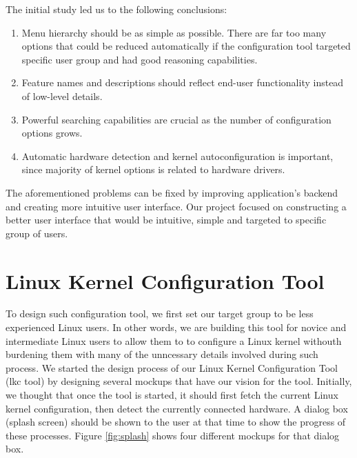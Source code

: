 \documentclass{chi2009}
\begin{document}

The initial study led us to the following conclusions:
\begin{enumerate}
\item Menu hierarchy should be as simple as possible. There are far too many options that could be reduced automatically if the configuration tool targeted specific user group and had good reasoning capabilities.
\item Feature names and descriptions should reflect end-user functionality instead of low-level details.
\item Powerful searching capabilities are crucial as the number of configuration options grows.
\item Automatic hardware detection and kernel autoconfiguration is important, since majority of kernel options is related to hardware drivers.
\end{enumerate}

The aforementioned problems can be fixed by improving application's backend and creating more intuitive user interface. Our project focused on constructing a better user interface that would be intuitive, simple and targeted to specific group of users.

\section{Linux Kernel Configuration Tool}\label{sec:lkc}

To design such configuration tool, we first set our target group to be less experienced Linux users. In other words, we are building this tool for novice and
intermediate Linux users to allow them to to configure a Linux kernel withouth burdening them with many of the unncessary details involved during such process.
We started the design process of our Linux Kernel Configuration Tool (lkc tool) by designing several mockups that have our vision for the tool. Initially, we
thought that once the tool is started, it should first fetch the current Linux kernel configuration, then detect the currently connected hardware. A dialog box
(splash screen) should be shown to the user at that time to show the progress of these processes. Figure \ref{fig:splash} shows four different mockups for that
dialog box. 

\end{document}
